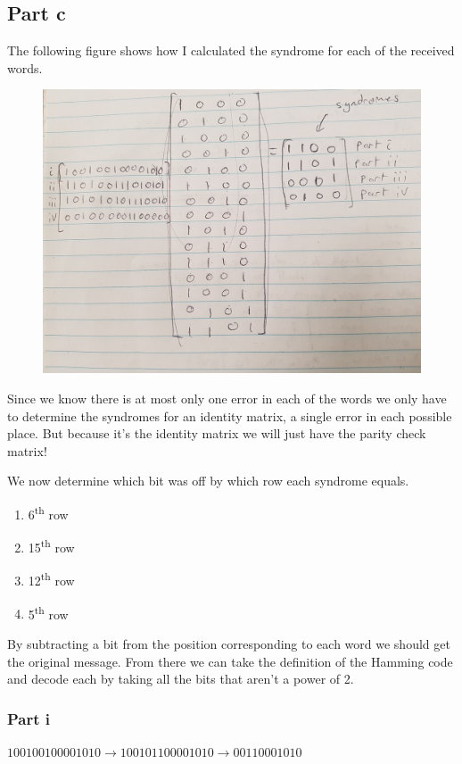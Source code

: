 \documentclass{article}
\begin{document}
\subsection{Part c}
The following figure shows how I calculated the syndrome for each of the
received words.
\begin{figure}[H]
    \centering
    \includegraphics[width=5in]{syndrome.jpg}
\end{figure}

Since we know there is at most only one error in each of the words we only
have to determine the syndromes for an identity matrix, a single error in each
possible place. But because it's the identity matrix we will just have the
parity check matrix!

We now determine which bit was off by which row each syndrome equals.
\begin{enumerate}
    \item 6\textsuperscript{th} row
    \item 15\textsuperscript{th} row
    \item 12\textsuperscript{th} row
    \item 5\textsuperscript{th} row
\end{enumerate}

By subtracting a bit from the position corresponding to each word we should
get the original message. From there we can take the definition of the
Hamming code and decode each by taking all the bits that aren't a power of 2.

\subsubsection{Part i}
$100100100001010 \to 100101100001010 \to 00110001010$
\end{document}
